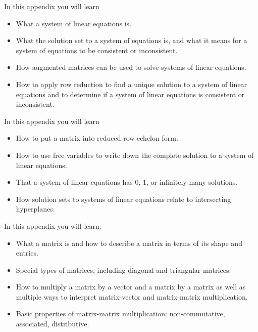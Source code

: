 \documentclass{workbook}
\begin{document}
\begin{appendix}\label{APPSLEI}

	In this appendix you will learn
	\begin{itemize}
		\item What a system of linear equations is.
		\item What the solution set to a system of equations is, and what it means for a system of equations
			to be consistent or inconsistent.
		\item How augmented matrices can be used to solve systems of linear equations.
		\item How to apply row reduction to find a unique solution to a system of linear
			equations and to determine if a system of linear equations is consistent or inconsistent.
	\end{itemize}

	
	
\end{appendix}

\begin{appendix}

	In this appendix you will learn
	\begin{itemize}
		\item How to put a matrix into reduced row echelon form.
		\item How to use free variables to write down the complete solution to a system of linear equations.
		\item That a system of linear equations has 0, 1, or infinitely many solutions.
		\item How solution sets to systems of linear equations relate to intersecting hyperplanes.
	\end{itemize}

	
	
\end{appendix}

\begin{appendix}
	In this appendix you will learn:
\begin{itemize}
  \item What a matrix is and how to describe a matrix in terms of its shape and entries.
  \item Special types of matrices, including diagonal and triangular matrices.
  \item How to multiply a matrix by a vector and a matrix by a matrix as well as multiple ways to
	  interpret matrix-vector and matrix-matrix multiplication.
  \item Basic properties of matrix-matrix multiplication: non-commutative, associated, distributive.
\end{itemize}



\end{appendix}
\end{document}
